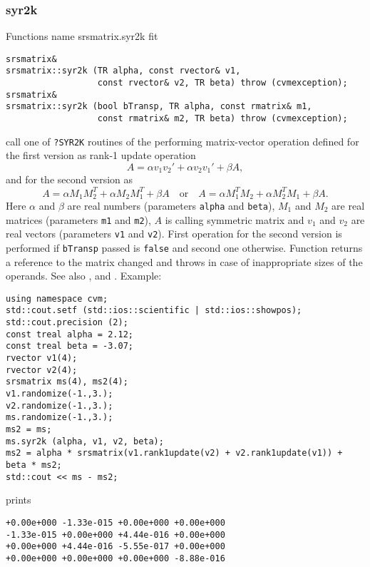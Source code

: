 \subsubsection{syr2k}
Functions%
\pdfdest name {srsmatrix.syr2k} fit
\begin{verbatim}
srsmatrix& 
srsmatrix::syr2k (TR alpha, const rvector& v1, 
                  const rvector& v2, TR beta) throw (cvmexception);
srsmatrix& 
srsmatrix::syr2k (bool bTransp, TR alpha, const rmatrix& m1, 
                  const rmatrix& m2, TR beta) throw (cvmexception);
\end{verbatim}
call one of \verb"?SYR2K" routines of the
performing  matrix-vector operation defined for the first version as
rank-1 update operation
\begin{equation*}
A=\alpha v_1 v_2' + \alpha v_2 v_1' + \beta A,
\end{equation*}
and for the second version as
\begin{equation*}
A=\alpha M_1 M_2^T + \alpha M_2 M_1^T + \beta A\quad
\text{or}\quad 
A=\alpha M_1^T M_2 + \alpha M_2^T M_1 + \beta A.
\end{equation*}
Here $\alpha$ and $\beta$ are real numbers 
(parameters \verb"alpha" and \verb"beta"),
$M_1$ and $M_2$ are real matrices (parameters \verb"m1" and \verb"m2"),
$A$ is  calling symmetric matrix
and $v_1$ and $v_2$ are real vectors (parameters \verb"v1" and \verb"v2").
First operation for the second version 
is performed if \verb"bTransp" passed
is \verb"false" and second one otherwise.
Function
returns a reference to the matrix changed and throws
in case of inappropriate sizes of the operands.
See also
,
 and .
Example:
\begin{Verbatim}
using namespace cvm;
std::cout.setf (std::ios::scientific | std::ios::showpos); 
std::cout.precision (2);
const treal alpha = 2.12;
const treal beta = -3.07;
rvector v1(4);
rvector v2(4);
srsmatrix ms(4), ms2(4);
v1.randomize(-1.,3.);
v2.randomize(-1.,3.);
ms.randomize(-1.,3.);
ms2 = ms;
ms.syr2k (alpha, v1, v2, beta);
ms2 = alpha * srsmatrix(v1.rank1update(v2) + v2.rank1update(v1)) + beta * ms2;
std::cout << ms - ms2;
\end{Verbatim}
prints
\begin{Verbatim}
+0.00e+000 -1.33e-015 +0.00e+000 +0.00e+000
-1.33e-015 +0.00e+000 +4.44e-016 +0.00e+000
+0.00e+000 +4.44e-016 -5.55e-017 +0.00e+000
+0.00e+000 +0.00e+000 +0.00e+000 -8.88e-016
\end{Verbatim}
